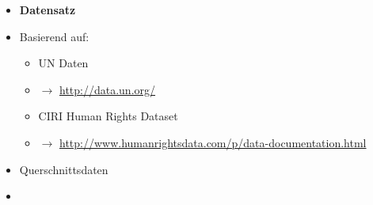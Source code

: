 \documentclass[aspectratio=169, journal, x11names, unknownkeysallowed, hyperref={colorlinks,
linkcolor = SS2,
urlcolor  = F3,
citecolor = F3,
anchorcolor = A4}, 12pt]{beamer}
\newcommand{\oarrow}{\textcolor{A1}{$\rightarrow$} }
\begin{document}
\begin{frame}[t]
  \begin{minipage}[t]{0.5\textwidth}
    \begin{itemize}
        \item[] \textbf{Datensatz}
        \item Basierend auf:
        \begin{itemize}
          \item UN Daten
          \item[] \oarrow \url{http://data.un.org/} 
          \item CIRI Human Rights Dataset 
          \item[] \oarrow \url{http://www.humanrightsdata.com/p/data-documentation.html}
        \end{itemize}
        \item Querschnittsdaten
    \end{itemize}
  \end{minipage}%
  \begin{minipage}[t]{0.5\textwidth}
    \begin{itemize}
      \item[]
    \end{itemize}
  \end{minipage}
\end{frame}
\end{document}
